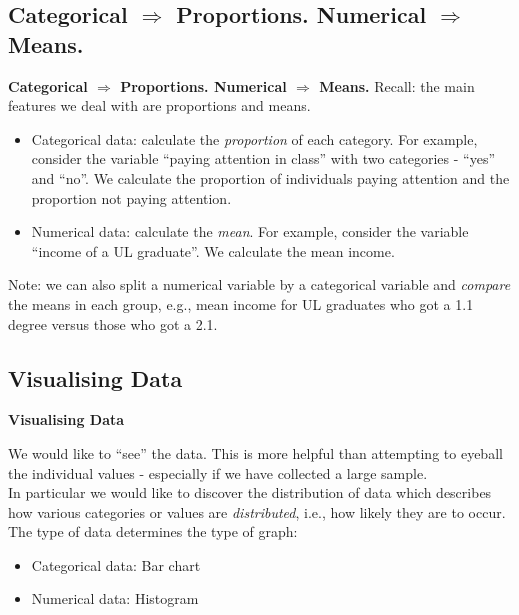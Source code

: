 \documentclass[]{report}
\begin{document}
		
		
		
		\subsection{Categorical $\Rightarrow$ Proportions. Numerical $\Rightarrow$ Means.}
		{ \textbf{Categorical $\Rightarrow$ Proportions. Numerical $\Rightarrow$ Means.}}
		Recall: the main features we deal with are { proportions} and { means}.\\[0.2cm]
		\begin{itemize}\itemsep0.5cm
			\item Categorical data: calculate the \emph{proportion} of each category. For example, consider the variable ``paying attention in class'' with two categories - ``yes'' and ``no''. We calculate the proportion of individuals paying attention and the proportion not paying attention.
			\item Numerical data: calculate the \emph{mean}. For example, consider the variable ``income of a UL graduate''. We calculate the mean income.\\[0.6cm]
		\end{itemize}
		
		Note: we can also split a numerical variable by a categorical variable and \emph{compare} the means in each group, e.g., mean income for UL graduates who got a 1.1 degree versus those who got a 2.1.
		
		
		
		\subsection{Visualising Data}
		{ \textbf{Visualising Data}}
		
		We would like to ``see'' the data. This is more helpful than attempting to eyeball the individual values - especially if we have collected a large sample.\\[0.4cm]
		
		In particular we would like to discover the { distribution of data} which describes how various categories or values are \emph{distributed}, i.e., how likely they are to occur.\\[0.6cm]
		
		The type of data determines the type of graph:\\[0.2cm]
		\begin{itemize}\itemsep0.3cm
			\item Categorical data: { Bar chart}
			\item Numerical data: { Histogram}
		\end{itemize}
		
\end{document}
